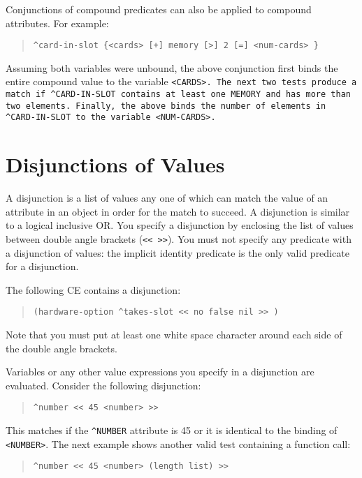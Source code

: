   Conjunctions of compound predicates can also be applied
  to compound attributes. For example:
\begin{quote}
\begin{verbatim}
^card-in-slot {<cards> [+] memory [>] 2 [=] <num-cards> }
\end{verbatim}
\end{quote}
  Assuming both variables were unbound, the above
  conjunction first binds the entire compound value to the
  variable \tt{<CARDS>}. The next two tests produce a match if
  \verb|^CARD-IN-SLOT| contains at least one \tt{MEMORY} and has more
  than two elements. Finally, the above binds the number
  of elements in \verb|^CARD-IN-SLOT| to the variable
  \tt{<NUM-CARDS>}.

\section{Disjunctions of Values}

  A disjunction is a list of values any one of which can
  match the value of an attribute in an object in order
  for the match to succeed. A disjunction is similar to a
  logical inclusive OR. You specify a disjunction by
  enclosing the list of values between double angle
  brackets (\verb|<< >>|). You must not specify any predicate
  with a disjunction of values: the implicit identity
  predicate is the only valid predicate for a disjunction.

  The following CE contains a disjunction:
\begin{quote}
\begin{verbatim}
(hardware-option ^takes-slot << no false nil >> )
\end{verbatim}
\end{quote}

  Note that you must put at least one white space
  character around each side of the double angle brackets.

  Variables or any other value expressions you specify in
  a disjunction are evaluated. Consider the following
  disjunction:
\begin{quote}
\begin{verbatim}
^number << 45 <number> >>
\end{verbatim}
\end{quote}

  This matches if the \verb|^NUMBER| attribute is 45 or it is
  identical to the binding of \verb|<NUMBER>|. The next example
  shows another valid test containing a function call:
\begin{quote}
\begin{verbatim}
^number << 45 <number> (length list) >>
\end{verbatim}
\end{quote}

